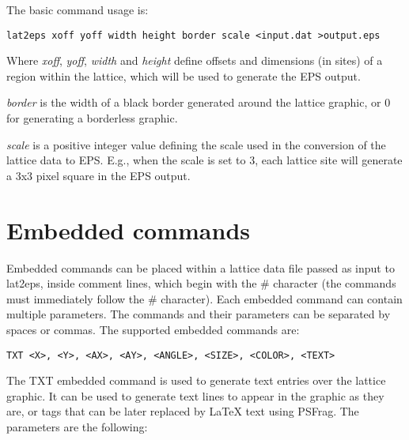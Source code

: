 \documentclass[a4paper]{article}
\begin{document}
The basic command usage is:
\bigbreak

\texttt{lat2eps  xoff yoff width height border scale  <input.dat  >output.eps}
\bigbreak

Where \textit{xoff}, \textit{yoff}, \textit{width} and \textit{height} define offsets and dimensions (in sites) of a region within the lattice, which will be used to generate the EPS output.
\bigbreak

\textit{border} is the width of a black border generated around the lattice graphic, or 0 for generating a borderless graphic.
\bigbreak

\textit{scale} is a positive integer value defining the scale used in the conversion of the lattice data to EPS. E.g., when the scale is set to 3, each lattice site will generate a 3x3 pixel square in the EPS output.
\bigbreak


\section{Embedded commands}
\bigbreak

Embedded commands can be placed within a lattice data file passed as input to lat2eps, inside comment lines, which begin with the \# character (the commands must immediately follow the \# character). Each embedded command can contain multiple parameters. The commands and their parameters can be separated by spaces or commas. The supported embedded commands are:
\bigbreak\bigbreak

\texttt{TXT <X>, <Y>, <AX>, <AY>, <ANGLE>, <SIZE>, <COLOR>, <TEXT>}
\bigbreak

The TXT embedded command is used to generate text entries over the lattice graphic. It can be used to generate text lines to appear in the graphic as they are, or tags that can be later replaced by LaTeX text using PSFrag. The parameters are the following:
\end{document}
